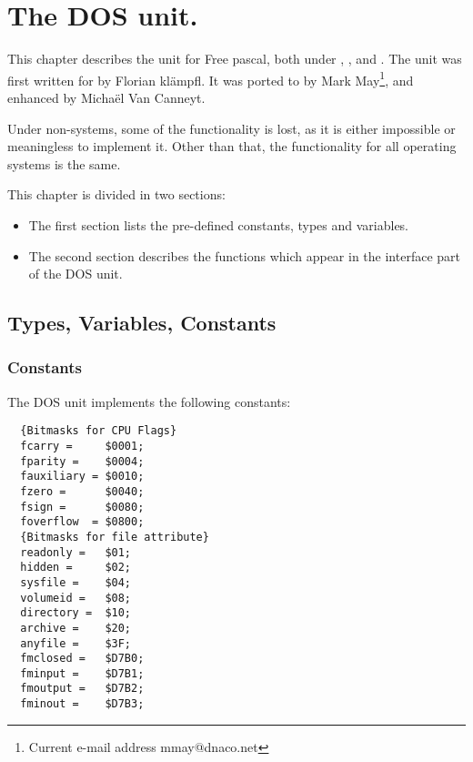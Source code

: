 %
%
%
%
%
\chapter{The DOS unit.}

This chapter describes the  unit for Free pascal, both under
\dos, \ostwo, \windows and \linux. 
The unit was first written for \dos by Florian kl\"ampfl. It was ported to 
\linux by Mark May\footnote{Current e-mail address \textsf{mmay@dnaco.net}}, 
and enhanced by Micha\"el Van Canneyt.

Under non-\dos systems, some of the functionality is lost, as it is either impossible 
or meaningless to implement it. Other than that, the functionality for all 
operating systems is the same.

This chapter is divided in two sections:
\begin{itemize}
\item The first section lists the pre-defined constants, types and variables. 
\item The second section describes the functions which appear in the
interface part of the DOS unit.
\end{itemize}

\section{Types, Variables, Constants}
\subsection {Constants}
The DOS unit implements the following constants:
\begin{verbatim}
  {Bitmasks for CPU Flags}
  fcarry =     $0001;
  fparity =    $0004;
  fauxiliary = $0010;
  fzero =      $0040;
  fsign =      $0080;
  foverflow  = $0800;
  {Bitmasks for file attribute}
  readonly =   $01;
  hidden =     $02;
  sysfile =    $04;
  volumeid =   $08;
  directory =  $10;
  archive =    $20;
  anyfile =    $3F;
  fmclosed =   $D7B0;
  fminput =    $D7B1;
  fmoutput =   $D7B2;
  fminout =    $D7B3;
\end{verbatim}
